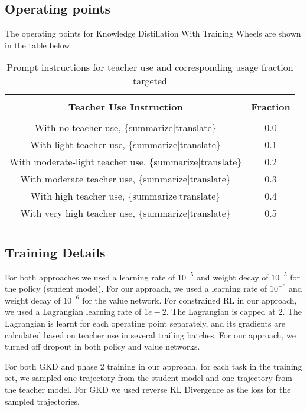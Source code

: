 \subsection{Operating points}

The operating points for Knowledge Distillation With Training Wheels are shown in the table below.

\begin{table}[h!]
    \centering
    \caption{Prompt instructions for teacher use and corresponding usage fraction targeted}
    \begin{tabular}{cc}
        \hline \\
        \textbf{Teacher Use Instruction} & \textbf{Fraction} \\
        \hline \\
        With no teacher use, \{summarize|translate\} & 0.0\\
        With light teacher use, \{summarize|translate\} & 0.1\\
        With moderate-light teacher use, \{summarize|translate\} & 0.2\\
        With moderate teacher use, \{summarize|translate\} & 0.3\\
        With high teacher use, \{summarize|translate\} & 0.4\\
        With very high teacher use, \{summarize|translate\} & 0.5\\
        \hline\\
    \end{tabular}
    \label{tab:my_label}
\end{table}

\subsection{Training Details}

For both approaches we used a learning rate of $10^{-5}$ and weight decay of $10^{-5}$ for the policy (student model). For our approach, we used a learning rate of $10^{-6}$ and weight decay of $10^{-6}$ for the value network. For constrained RL in our approach, we used a Lagrangian learning rate of $1e-2$. The Lagrangian is capped at $2$. The Lagrangian is learnt for each operating point separately, and its gradients are calculated based on teacher use in several trailing batches. For our approach, we turned off dropout in both policy and value networks.

For both GKD and phase 2 training in our approach, for each task in the training set, we sampled one trajectory from the student model and one trajectory from the teacher model. For GKD we used reverse KL Divergence as the loss for the sampled trajectories.

